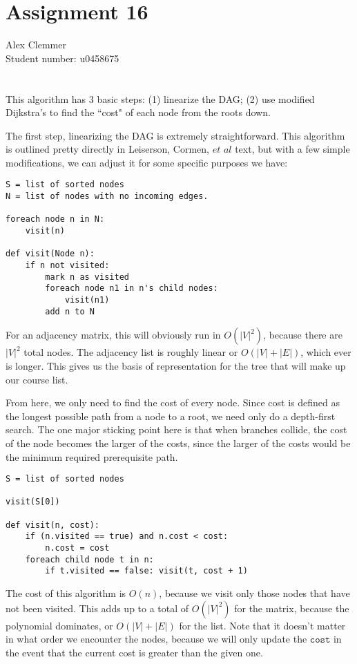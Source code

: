 \documentclass[a4paper]{article}
\begin{document}
\section*{Assignment 16}
Alex Clemmer\\
Student number: u0458675

\section{}

This algorithm has 3 basic steps: (1) linearize the DAG; (2) use modified Dijkstra's to find the ``cost" of each node from the roots down.

The first step, linearizing the DAG is extremely straightforward. This algorithm is outlined pretty directly in Leiserson, Cormen, $\textit{et al}$ text, but with a few simple modifications, we can adjust it for some specific purposes we have:

\begin{verbatim}
S = list of sorted nodes
N = list of nodes with no incoming edges.

foreach node n in N:
    visit(n)

def visit(Node n):
    if n not visited:
        mark n as visited
        foreach node n1 in n's child nodes:
            visit(n1)
        add n to N
\end{verbatim}

For an adjacency matrix, this will obviously run in $O(|V|^2)$, because there are $|V|^2$ total nodes. The adjacency list is roughly linear or $O(|V| + |E|)$, which ever is longer. This gives us the basis of representation for the tree that will make up our course list.

From here, we only need to find the cost of every node. Since cost is defined as the longest possible path from a node to a root, we need only do a depth-first search. The one major sticking point here is that when branches collide, the cost of the node becomes the larger of the costs, since the larger of the costs would be the minimum required prerequisite path.

\begin{verbatim}
S = list of sorted nodes

visit(S[0])

def visit(n, cost):
    if (n.visited == true) and n.cost < cost:
        n.cost = cost
    foreach child node t in n:
        if t.visited == false: visit(t, cost + 1)
\end{verbatim}

The cost of this algorithm is $O(n)$, because we visit only those nodes that have not been visited. This adds up to a total of $O(|V|^2)$ for the matrix, because the polynomial dominates, or $O(|V| + |E|)$ for the list. Note that it doesn't matter in what order we encounter the nodes, because we will only update the $\texttt{cost}$ in the event that the current cost is greater than the given one.
\end{document}
